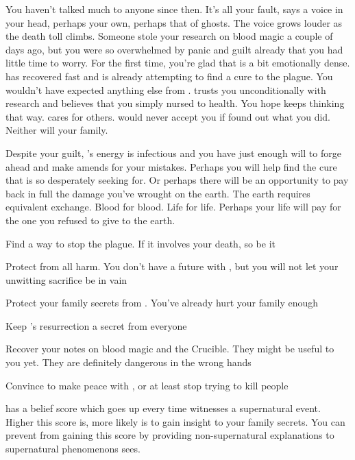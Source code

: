 \documentclass[char]{Pestilence}
\begin{document}
You haven't talked much to anyone since then. It's all your fault, says a voice in your head, perhaps your own, perhaps that of ghosts. The voice grows louder as the death toll climbs. Someone stole your research on blood magic a couple of days ago, but you were so overwhelmed by panic and guilt already that you had little time to worry. For the first time, you're glad that \cOutsider{} is a bit emotionally dense. \cOutsider{\They} has recovered fast and is already attempting to find a cure to the plague. You wouldn't have expected anything else from \cOutsider{\them}. \cOutsider{\They} trusts you unconditionally with \cOutsider{\their} research and believes that you simply nursed \cOutsider{\them} to health. You hope \cOutsider{\they} keeps thinking that way. \cOutsider{} cares for others. \cOutsider{\They} would never accept you if \cOutsider{\they} found out what you did. Neither will your family.

Despite your guilt, \cOutsider{}'s energy is infectious and you have just enough will to forge ahead and make amends for your mistakes. Perhaps you will help find the cure that \cOutsider{} is so desperately seeking for. Or perhaps there will be an opportunity to pay back in full the damage you've wrought on the earth. The earth requires equivalent exchange. Blood for blood. Life for life. Perhaps your life will pay for the one you refused to give to the earth.  

\begin{itemz}[Goals]
	\item Find a way to stop the plague. If it involves your death, so be it
	\item Protect \cOutsider{} from all harm. You don't have a future with \cOutsider{\them}, but you will not let your unwitting sacrifice be in vain
	\item Protect your family secrets from \cOutsider{}. You've already hurt your family enough
	\item Keep \cOutsider{}'s resurrection a secret from everyone
	\item Recover your notes on blood magic and the Crucible. They might be useful to you yet. They are definitely dangerous in the wrong hands
	\item Convince \cApprentice{} to make peace with \cOutsider{}, or at least stop trying to kill people
\end{itemz}

\begin{itemz}[Notes]
	\item \cOutsider{} has a belief score which goes up every time \cOutsider{\they} witnesses a supernatural event. Higher this score is, more likely \cOutsider{\they} is to gain insight to your family secrets. You can prevent \cOutsider{\them} from gaining this score by providing non-supernatural explanations to supernatural phenomenons \cOutsider{\they} sees. 
\end{itemz}
\end{document}
